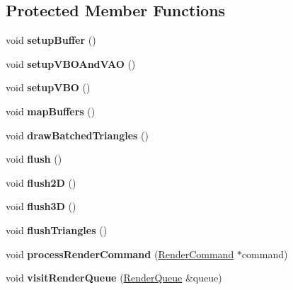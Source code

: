 \subsection*{Protected Member Functions}
\begin{DoxyCompactItemize}
\item 
\mbox{\label{classRenderer_a846c8036d380c3651582da600d1eadd5}} 
void {\bfseries setup\+Buffer} ()
\item 
\mbox{\label{classRenderer_a84977862635dd200da3957b89c16b4f9}} 
void {\bfseries setup\+V\+B\+O\+And\+V\+AO} ()
\item 
\mbox{\label{classRenderer_acd535a88b6879d4e50e6717bcb01e46f}} 
void {\bfseries setup\+V\+BO} ()
\item 
\mbox{\label{classRenderer_a4471709c3a5b0812436d2939d5078cf1}} 
void {\bfseries map\+Buffers} ()
\item 
\mbox{\label{classRenderer_aacd5c7ce668eef51b001932e5d780eb8}} 
void {\bfseries draw\+Batched\+Triangles} ()
\item 
\mbox{\label{classRenderer_a35401aa28259d4560aba5cebd2bac4e3}} 
void {\bfseries flush} ()
\item 
\mbox{\label{classRenderer_aba52cc3f450185b08b001921044325f8}} 
void {\bfseries flush2D} ()
\item 
\mbox{\label{classRenderer_abe15dfa1eabb3fa26b3c377fada8c379}} 
void {\bfseries flush3D} ()
\item 
\mbox{\label{classRenderer_a447a83b11eec6bfa491a1f1058c819bd}} 
void {\bfseries flush\+Triangles} ()
\item 
\mbox{\label{classRenderer_a2eecd62d7c2ce2f2d68c84999280f4fe}} 
void {\bfseries process\+Render\+Command} (\hyperlink{classRenderCommand}{Render\+Command} $\ast$command)
\item 
\mbox{\label{classRenderer_a7e7e019d797e1f4acd25a8673aed2fef}} 
void {\bfseries visit\+Render\+Queue} (\hyperlink{classRenderQueue}{Render\+Queue} \&queue)

\end{DoxyCompactItemize}
